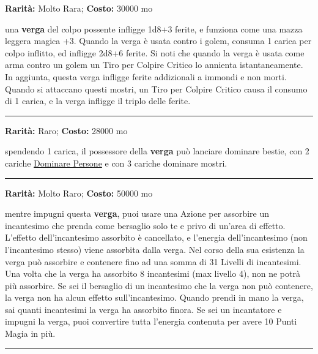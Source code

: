 \begin{multicols}{2}
\textbf{Rarità:} Molto Rara; \textbf{Costo:} 30000 mo

una \textbf{verga} del colpo possente infligge 1d8+3 ferite, e funziona come una mazza leggera magica +3. Quando la verga è usata contro i golem, consuma 1 carica per colpo inflitto, ed infligge 2d8+6 ferite. Si noti che quando la verga è usata come arma contro un golem un Tiro per Colpire Critico lo annienta istantaneamente. In aggiunta, questa verga infligge ferite addizionali a immondi e non morti. Quando si attaccano questi mostri, un Tiro per Colpire Critico causa il consumo di 1 carica, e la verga infligge il triplo delle ferite.

\smallskip\noindent\rule{\linewidth}{2pt}  \hypertarget{Vergadell'Ammaliamento}{}\medskip{}\noindent\label{Vergadell'Ammaliamento}

\textbf{Rarità:} Raro; \textbf{Costo:} 28000 mo

spendendo 1 carica, il possessore della \textbf{verga} può lanciare dominare bestie, con 2 cariche \hyperlink{Dominare Persone}{Dominare Persone} e con 3 cariche dominare mostri.

\smallskip\noindent\rule{\linewidth}{2pt}  \hypertarget{Vergadell'Assorbimento}{}\medskip{}\noindent\label{Vergadell'Assorbimento}

\textbf{Rarità:} Molto Raro; \textbf{Costo:} 50000 mo

mentre impugni questa \textbf{verga}, puoi usare una Azione per assorbire un incantesimo che prenda come bersaglio solo te e privo di un'area di effetto. L'effetto dell'incantesimo assorbito è cancellato, e l'energia dell'incantesimo (non l'incantesimo stesso) viene assorbita dalla verga. Nel corso della sua esistenza la verga può assorbire e contenere fino ad una somma di 31 Livelli di incantesimi. Una volta che la verga ha assorbito 8 incantesimi (max livello 4), non ne potrà più assorbire. Se sei il bersaglio di un incantesimo che la verga non può contenere, la verga non ha alcun effetto sull'incantesimo. Quando prendi in mano la verga, sai quanti incantesimi la verga ha assorbito finora. Se sei un incantatore e impugni la verga, puoi convertire tutta l'energia contenuta per avere 10 Punti Magia in più.

\smallskip\noindent\rule{\linewidth}{2pt}  \hypertarget{VergadellaForzaSovrana}{}\medskip{}\noindent\label{VergadellaForzaSovrana}


\end{multicols}
